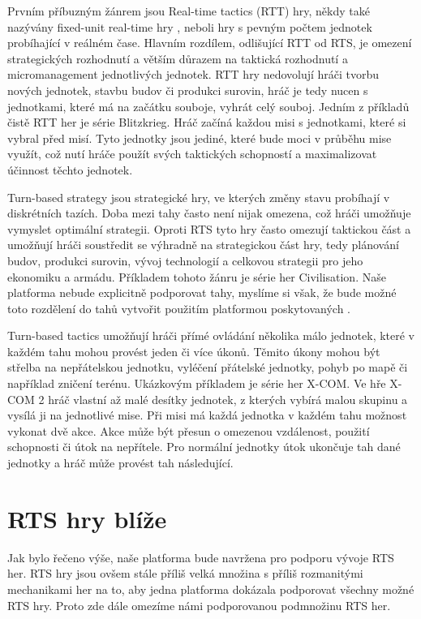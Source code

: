 Prvním příbuzným žánrem jsou Real-time tactics (RTT) hry, někdy také nazývány fixed-unit real-time hry \citep{site:stratg02}, neboli hry s pevným počtem jednotek probíhající v reálném čase. Hlavním rozdílem, odlišující RTT od RTS, je omezení  strategických rozhodnutí a větším důrazem na taktická rozhodnutí a micromanagement jednotlivých jednotek. RTT hry nedovolují hráči tvorbu nových jednotek, stavbu budov či produkci surovin, hráč je tedy nucen s jednotkami, které má na začátku souboje, vyhrát celý souboj.  Jedním z příkladů čistě RTT her je série Blitzkrieg. Hráč začíná každou misi s jednotkami, které si vybral před misí. Tyto jednotky jsou jediné, které bude moci v průběhu mise využít, což nutí hráče použít svých taktických schopností a maximalizovat účinnost těchto jednotek. 

Turn-based strategy jsou strategické hry, ve kterých změny stavu probíhají v diskrétních tazích. Doba mezi tahy často není nijak omezena, což hráči umožňuje vymyslet optimální strategii. Oproti RTS tyto hry často omezují taktickou část a umožňují hráči soustředit se výhradně na strategickou část hry, tedy plánování budov, produkci surovin, vývoj technologií a celkovou strategii pro jeho ekonomiku a armádu. Příkladem tohoto žánru je série her Civilisation\citep{site:civ5}.  Naše platforma nebude explicitně podporovat tahy, myslíme si však, že bude možné toto rozdělení do tahů vytvořit použitím platformou poskytovaných .


Turn-based tactics umožňují hráči přímé ovládání několika málo jednotek, které v každém tahu mohou provést jeden či více úkonů. Těmito úkony mohou být střelba na nepřátelskou jednotku, vyléčení přátelské jednotky, pohyb po mapě či například zničení terénu. Ukázkovým příkladem je série her X-COM. Ve hře X-COM 2 hráč vlastní až malé desítky jednotek, z kterých vybírá malou skupinu a vysílá ji na jednotlivé mise. Při misi má každá jednotka v každém tahu možnost vykonat dvě akce. Akce může být přesun o omezenou vzdálenost, použití schopnosti či útok na nepřítele. Pro normální jednotky útok ukončuje tah dané jednotky a hráč může provést tah následující. 



\section{RTS hry blíže}
Jak bylo řečeno výše, naše platforma bude navržena pro podporu vývoje RTS her. RTS hry jsou ovšem stále příliš velká množina s příliš rozmanitými mechanikami her na to, aby jedna platforma dokázala podporovat všechny možné RTS hry. Proto zde dále omezíme námi podporovanou podmnožinu RTS her.

